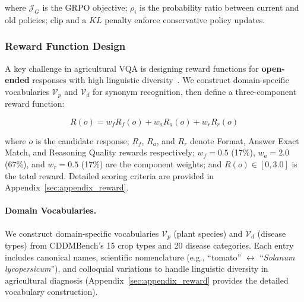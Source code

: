 \documentclass[11pt]{article}
\begin{document}
\noindent where \(\mathcal{J}_G\) is the GRPO objective; \(\rho_i\) is the probability ratio between current and old policies; clip and a $KL$ penalty enforce conservative policy updates.

\subsubsection{Reward Function Design}
\label{sec:reward}

A key challenge in agricultural VQA is designing reward functions for \textbf{open-ended} responses with high linguistic diversity~\cite{qian2025toolrl,eschmann2021reward,liu2024multimodal,lai2025med,pan2025medvlm}. We construct domain-specific vocabularies $\mathcal{V}_p$ and $\mathcal{V}_d$ for synonym recognition, then define a three-component reward function:

\begin{equation}
R(o) = w_f R_f(o) + w_a R_a(o) + w_r R_r(o)
\label{eq:total_reward}
\end{equation}

\noindent where $o$ is the candidate response; $R_f$, $R_a$, and $R_r$ denote Format, Answer Exact Match, and Reasoning Quality rewards respectively; $w_f=0.5$ (17\%), $w_a=2.0$ (67\%), and $w_r=0.5$ (17\%) are the component weights; and $R(o) \in [0, 3.0]$ is the total reward. Detailed scoring criteria are provided in Appendix~\ref{sec:appendix_reward}.

\paragraph{Domain Vocabularies.}
We construct domain-specific vocabularies $\mathcal{V}_p$ (plant species) and $\mathcal{V}_d$ (disease types) from CDDMBench's 15 crop types and 20 disease categories. Each entry includes canonical names, scientific nomenclature (e.g., ``tomato'' $\leftrightarrow$ ``\emph{Solanum lycopersicum}''), and colloquial variations to handle linguistic diversity in agricultural diagnosis (Appendix~\ref{sec:appendix_reward} provides the detailed vocabulary construction).
\end{document}
